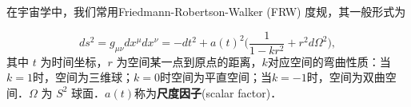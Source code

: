 
在宇宙学中，我们常用Friedmann-Robertson-Walker (FRW) 度规，其一般形式为

\begin{equation}
ds^2=g_{\mu\nu}dx^{\mu}dx^{\nu}=-dt^2+a(t)^2\Big(\frac{1}{1-kr^2}+r^2 d\Omega^2\Big),
\end{equation}
其中 $t$ 为时间坐标，$r$ 为空间某一点到原点的距离，$k$对应空间的弯曲性质：当$k=1$时，空间为三维球；$k=0$时空间为平直空间；当$k=-1$时，空间为双曲空间．$\Omega$ 为 $S^2$ 球面．$a(t)$称为\textbf{尺度因子}(scalar factor)．

